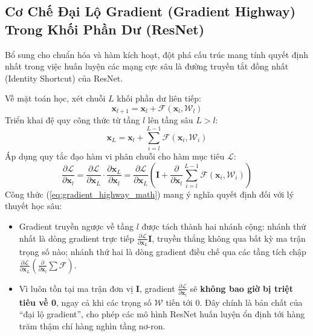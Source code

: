 \documentclass[12pt,a4paper]{report}
\begin{document}
\subsection{Cơ Chế Đại Lộ Gradient (Gradient Highway) Trong Khối Phần Dư (ResNet)}
Bổ sung cho chuẩn hóa và hàm kích hoạt, đột phá cấu trúc mang tính quyết định nhất trong việc huấn luyện các mạng cực sâu là đường truyền tắt đồng nhất (Identity Shortcut) của ResNet. 

Về mặt toán học, xét chuỗi $L$ khối phần dư liên tiếp:
\begin{equation}
    \mathbf{x}_{l+1} = \mathbf{x}_l + \mathcal{F}(\mathbf{x}_l, \mathcal{W}_l)
\end{equation}
Triển khai đệ quy công thức từ tầng $l$ lên tầng sâu $L > l$:
\begin{equation}
    \mathbf{x}_L = \mathbf{x}_l + \sum_{i=l}^{L-1} \mathcal{F}(\mathbf{x}_i, \mathcal{W}_i)
\end{equation}
Áp dụng quy tắc đạo hàm vi phân chuỗi cho hàm mục tiêu $\mathcal{L}$:
\begin{equation}
    \frac{\partial \mathcal{L}}{\partial \mathbf{x}_l} = \frac{\partial \mathcal{L}}{\partial \mathbf{x}_L} \cdot \frac{\partial \mathbf{x}_L}{\partial \mathbf{x}_l} = \frac{\partial \mathcal{L}}{\partial \mathbf{x}_L} \left( \mathbf{I} + \frac{\partial}{\partial \mathbf{x}_l} \sum_{i=l}^{L-1} \mathcal{F}(\mathbf{x}_i, \mathcal{W}_i) \right)
    \label{eq:gradient_highway_math}
\end{equation}
Công thức (\ref{eq:gradient_highway_math}) mang ý nghĩa quyết định đối với lý thuyết học sâu:
\begin{itemize}[leftmargin=*]
    \item Gradient truyền ngược về tầng $l$ được tách thành hai nhánh cộng: nhánh thứ nhất là dòng gradient trực tiếp $\frac{\partial \mathcal{L}}{\partial \mathbf{x}_L} \mathbf{I}$, truyền thẳng không qua bất kỳ ma trận trọng số nào; nhánh thứ hai là dòng gradient điều chế qua các tầng tích chập $\frac{\partial \mathcal{L}}{\partial \mathbf{x}_L} \left( \frac{\partial}{\partial \mathbf{x}_l} \sum \mathcal{F} \right)$.
    \item Vì luôn tồn tại ma trận đơn vị $\mathbf{I}$, gradient $\frac{\partial \mathcal{L}}{\partial \mathbf{x}_l}$ sẽ \textbf{không bao giờ bị triệt tiêu về 0}, ngay cả khi các trọng số $\mathcal{W}$ tiến tới 0. Đây chính là bản chất của ``đại lộ gradient'', cho phép các mô hình ResNet huấn luyện ổn định tới hàng trăm thậm chí hàng nghìn tầng nơ-ron.
\end{itemize}
\end{document}
